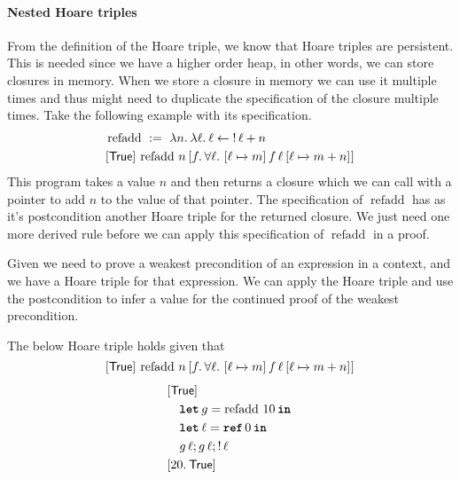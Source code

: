 \documentclass[thesis.tex]{subfiles}
\begin{document}
\paragraph*{Nested Hoare triples} From the definition of the Hoare triple, we know that Hoare triples are persistent. This is needed since we have a higher order heap, in other words, we can store closures in memory. When we store a closure in memory we can use it multiple times and thus might need to duplicate the specification of the closure multiple times. Take the following example with its specification.
\begin{align*}
   & \operatorname{refadd}\ :=\ \Lam n. \Lam \loc. \loc \gets \deref \loc + n                                                 \\
   & \hoare{\TRUE}{\operatorname{refadd}\, n}{\Ret f. {\forall \loc.\ \hoare{\loc \fmapsto m}{f\, \loc}{\loc\fmapsto m + n}}}
\end{align*}
This program takes a value $n$ and then returns a closure which we can call with a pointer to add $n$ to the value of that pointer. The specification of $\operatorname{refadd}$ has as it's postcondition another Hoare triple for the returned closure. We just need one more derived rule before we can apply this specification of $\operatorname{refadd}$ in a proof.
Given we need to prove a weakest precondition of an expression in a context, and we have a Hoare triple for that expression. We can apply the Hoare triple and use the postcondition to infer a value for the continued proof of the weakest precondition.
\begin{lemma}
  The below Hoare triple holds given that $$\hoare{\TRUE}{\operatorname{refadd}\, n}{\Ret f. {\forall \loc.\ \hoare{\loc \fmapsto m}{f\, \loc}{\loc\fmapsto m + n}}}$$
  \[
    \begin{aligned}
       & \rightbracket{\TRUE}                         \\
       & \quad \Let g = \operatorname{refadd}\, 10 in \\
       & \quad \Let \loc = \Alloc 0 in                \\
       & \quad g\, \loc; g\, \loc; \deref \loc        \\
       & \rightbracket{\Ret 20. \TRUE}
    \end{aligned}
  \]
\end{lemma}
\end{document}
